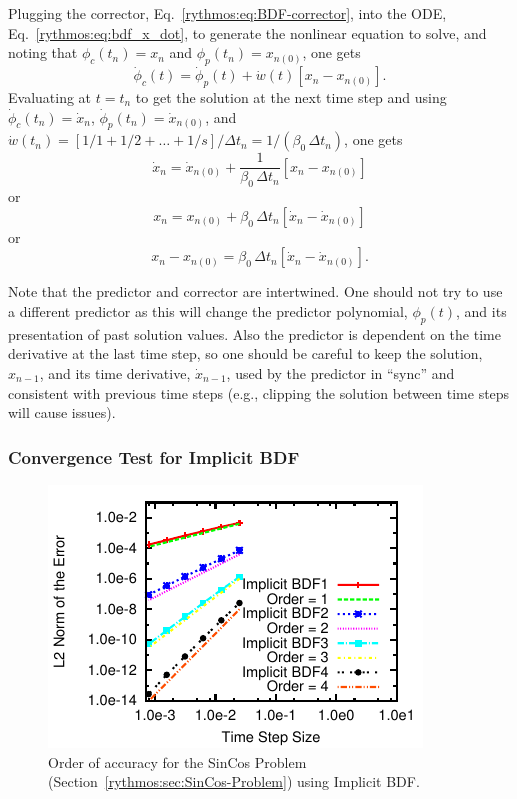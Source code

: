 Plugging the corrector, Eq.~\ref{rythmos:eq:BDF-corrector}, into
the ODE, Eq.~\ref{rythmos:eq:bdf_x_dot}, to generate the nonlinear
equation to solve, and noting that $\phi_{c}(t_{n})=x_{n}$ and $\phi_{p}(t_{n})=x_{n(0)}$,
one gets
\[
\dot{\phi}_{c}(t)=\dot{\phi}_{p}(t)+\dot{w}(t)[x{}_{n}-x_{n(0)}].
\]
Evaluating at $t=t_{n}$ to get the solution at the next time step
and using $\dot{\phi}_{c}(t_{n})=\dot{x}_{n}$, $\dot{\phi}_{p}(t_{n})=\dot{x}_{n(0)}$,
and $\dot{w}(t_{n})=[1/1+1/2+\ldots+1/s]/\Delta t_{n}=1/(\beta_{0}\,\Delta t_{n})$,
one gets
\[
\dot{x}_{n}=\dot{x}_{n(0)}+\frac{1}{\beta_{0}\,\Delta t_{n}}[x{}_{n}-x_{n(0)}]
\]
or
\[
x{}_{n}=x_{n(0)}+\beta_{0}\,\Delta t_{n}[\dot{x}_{n}-\dot{x}_{n(0)}]
\]
or
\[
x{}_{n}-x_{n(0)}=\beta_{0}\,\Delta t_{n}[\dot{x}_{n}-\dot{x}_{n(0)}].
\]


Note that the predictor and corrector are intertwined. One should
not try to use a different predictor as this will change the predictor
polynomial, $\phi_{p}(t)$, and its presentation of past solution
values. Also the predictor is dependent on the time derivative at
the last time step, so one should be careful to keep the solution,
$x_{n-1}$, and its time derivative, $\dot{x}_{n-1}$, used by the
predictor in ``sync'' and consistent with previous time steps (e.g.,
clipping the solution between time steps will cause issues).


\subsubsection{Convergence Test for Implicit BDF}

\begin{figure}[H]
\centering{}\includegraphics[scale=1.5]{figures/ImplicitBDF4}\caption{Order of accuracy for the SinCos Problem (Section~\ref{rythmos:sec:SinCos-Problem})
using Implicit BDF.}
\end{figure}

